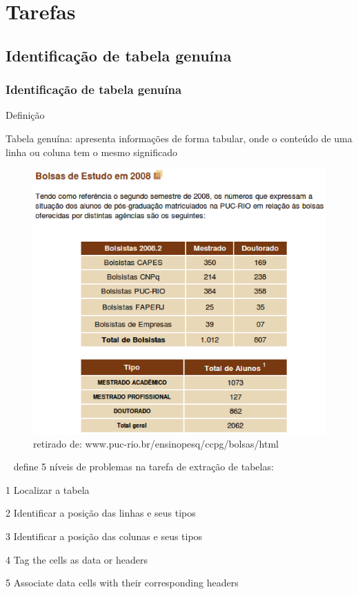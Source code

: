 \documentclass{beamer}
\newenvironment{my_itemize}{
\begin{itemize}
  \setlength{\itemsep}{5pt}
  \setlength{\parskip}{2pt}
  \setlength{\parsep}{3pt}
}{\end{itemize}}
\begin{document}
\section{Tarefas}
\begin{frame}[allowframebreaks]
  \subsection{Identificação de tabela genuína}
  \frametitle{Identificação de tabela genuína}
  \begin{my_itemize}
    \item Definição
    \begin{my_itemize}
    \item Tabela genuína: apresenta informações de forma tabular, onde o conteúdo de uma linha ou coluna tem o mesmo significado
    \end{my_itemize}

\begin{figure}[h]
    \center
    \includegraphics[scale=0.25]{img/table}
    \caption{retirado de: www.puc-rio.br/ensinopesq/ccpg/bolsas/html}
\end{figure}

\newpage
    \item ~\cite{Pinto2003} define 5 níveis de problemas na tarefa de extração de tabelas:
    \begin{my_itemize}
    \item[1] \alert{Localizar a tabela}
    \item[2] Identificar a posição das linhas e seus tipos
    \item[3] Identificar a posição das colunas e seus tipos
    \item[4] Tag the cells as data or headers
    \item[5] Associate data cells with their corresponding headers
    \end{my_itemize}


\end{my_itemize}
\end{frame}
\end{document}
